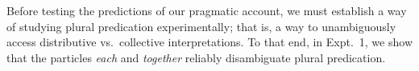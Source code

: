 \documentclass[preprint,12pt,authoryear,titlepage]{elsarticle}
\newcommand{\ndg}[1]{\textcolor{Green}{[ndg: #1]}}
\begin{document}
Before testing the predictions of our pragmatic account, we must establish a way of studying plural predication experimentally; that is, a way to unambiguously access distributive vs.~collective interpretations. To that end, in Expt.~1, we show that the particles \emph{each} and \emph{together} reliably disambiguate plural predication. 











%
%
\end{document}
